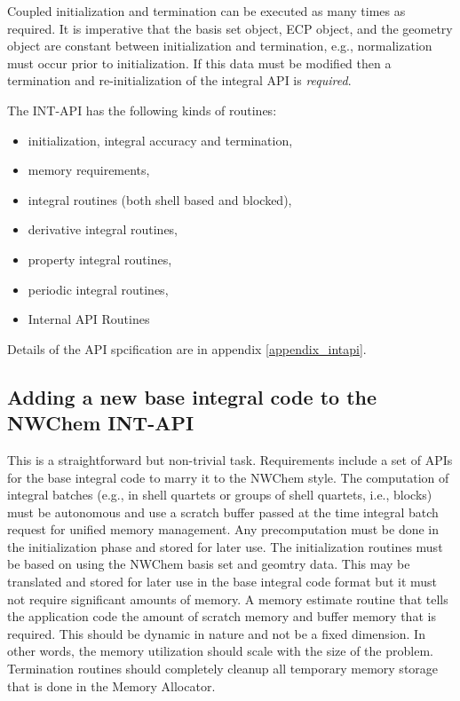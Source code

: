 Coupled initialization and termination can be executed as many times 
as required. It is imperative that the basis set object, ECP object, 
and the geometry object are constant between initialization and 
termination, e.g., normalization must occur prior to initialization. 
If this data must be modified then a termination and re-initialization 
of the integral API is {\it required}. 
 
The INT-API has the following kinds of routines: 
\begin{itemize} 
\item initialization, integral accuracy and termination, 
\item memory requirements, 
\item integral routines (both shell based and blocked), 
\item derivative integral routines, 
\item property integral routines, 
\item periodic integral routines, 
\item Internal API Routines 
\end{itemize} 
 
Details of the API spcification are in appendix \ref{appendix_intapi}. 
 
\subsection{Adding a new base integral code to the NWChem INT-API} 
 
This is a straightforward but non-trivial task.  Requirements include 
a set of APIs for the base integral code to marry it to the NWChem 
style.  The computation of integral batches (e.g., in shell quartets 
or groups of shell quartets, i.e., blocks) must be autonomous and use 
a scratch buffer passed at the time integral batch request for unified 
memory management.  Any precomputation must be done in the 
initialization phase and stored for later use.  The initialization 
routines must be based on using the NWChem basis set and geomtry data. 
This may be translated and stored for later use in the base integral 
code format but it must not require significant amounts of memory.  A 
memory estimate routine that tells the application code the amount of 
scratch memory and buffer memory that is required.  This should be 
dynamic in nature and not be a fixed dimension.  In other words, the 
memory utilization should scale with the size of the problem. 
Termination routines should completely cleanup all temporary memory 
storage that is done in the Memory Allocator.   
 
